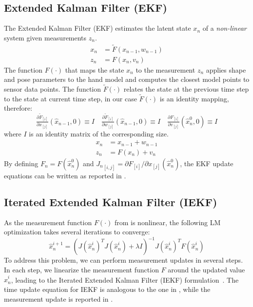 \subsection{Extended Kalman Filter (EKF)}
\label{app:ekf}
The Extended Kalman Filter (EKF) estimates the latent state $x_n$ of a \emph{non-linear} system given measurements $z_n$.
% 
\begin{align}
x_n &= \tilde{F}(x_{n - 1},  w_{n - 1}) \\
z_n &= F(x_n, v_n)
\end{align}
% 
The function $F(\cdot)$ that maps the state $x_n$ to the measurement $z_n$ applies shape and pose parameters to the hand model and computes the closest model points to sensor data points. 
The function $\tilde{F}(\cdot)$ relates the state at the previous time step to the state at current time step, in our case $\tilde{F}(\cdot)$ is an identity mapping, therefore:
\begin{equation*}
\tfrac{ \partial \tilde{F}_{[i]}}{ \partial x_{[j]}}(\hat{x}_{n - 1}, 0) \equiv I
\quad
\tfrac{ \partial \tilde{F}_{[i]}}{ \partial w_{[j]}}(\hat{x}_{n - 1}, 0) \equiv I
\quad
\tfrac{ \partial F_{[i]}}{ \partial v_{[j]}}(\hat{x}_n^0, 0) \equiv I
\end{equation*}
% 
where $I$ is an identity matrix of the corresponding size.
% 
% 
\begin{align}
x_n &= x_{n - 1} + w_{n - 1} \\
z_n &= F(x_n) + v_n 
\end{align}
%
By defining $F_n = F(\hat{x}_n^0)$ and ${J_n}_{[i, j]} = \partial F_{[i]} / \partial x_{[j]}(\hat{x}_n^0)$, the EKF update equations can be written as reported in .
%



\subsection{Iterated Extended Kalman Filter (IEKF)}
\label{app:iekf}
As the measurement function $F(\cdot)$ from  is nonlinear, the following LM optimization takes several iterations to converge: 
% 
\begin{equation}
\hat{x}_n^{i + 1} = (J(\hat{x}_n^i) ^T J(\hat{x}_n^i) + \lambda I)^{-1} J(\hat{x}_n^i)^T F(\hat{x}_n^i)   
\end{equation}
% 
To address this problem, we can perform measurement updates in several steps. In each step, we linearize the measurement function $F$ around the updated value $\hat{x}_n^i$, leading to the Iterated Extended Kalman Filter (IEKF) formulation~\cite{havlik2015performance}. The time update equation for IEKF is analogous to the one in , while the measurement update is reported in . 






 
